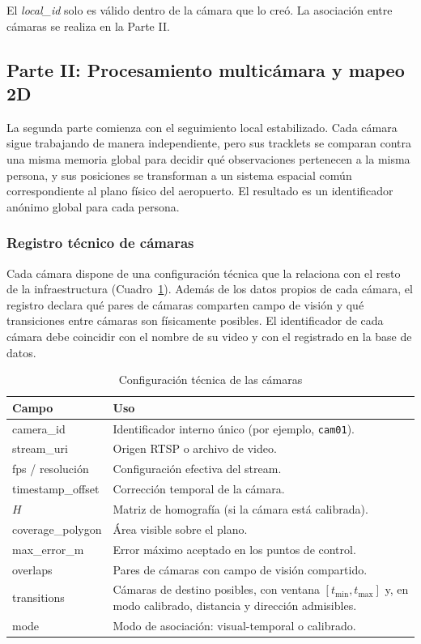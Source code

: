 \documentclass[12pt,letterpaper]{article}
\begin{document}
El \textit{local\_id} solo es válido dentro de la cámara que lo creó. La
asociación entre cámaras se realiza en la Parte II.

\subsection{Parte II: Procesamiento multicámara y mapeo 2D}

La segunda parte comienza con el seguimiento local estabilizado. Cada
cámara sigue trabajando de manera independiente, pero sus tracklets se
comparan contra una misma memoria global para decidir qué observaciones
pertenecen a la misma persona, y sus posiciones se transforman a un
sistema espacial común correspondiente al plano físico del aeropuerto.
El resultado es un identificador anónimo global para cada persona.

\subsubsection{Registro técnico de cámaras}

Cada cámara dispone de una configuración técnica que la relaciona con el
resto de la infraestructura (Cuadro~\ref{tab:camera_configuration}).
Además de los datos propios de cada cámara, el registro declara qué pares
de cámaras comparten campo de visión y qué transiciones entre cámaras son
físicamente posibles. El identificador de cada cámara debe coincidir con
el nombre de su video y con el registrado en la base de datos.

\begin{table}[H]
\caption{Configuración técnica de las cámaras}
\label{tab:camera_configuration}
\centering
\footnotesize
\begin{tabular}{p{}p{}}
\hline
\textbf{Campo} & \textbf{Uso} \\
\hline
camera\_id & Identificador interno único (por ejemplo, \texttt{cam01}). \\
stream\_uri & Origen RTSP o archivo de video. \\
fps / resolución & Configuración efectiva del stream. \\
timestamp\_offset & Corrección temporal de la cámara. \\
$H$ & Matriz de homografía (si la cámara está calibrada). \\
coverage\_polygon & Área visible sobre el plano. \\
max\_error\_m & Error máximo aceptado en los puntos de control. \\
overlaps & Pares de cámaras con campo de visión compartido. \\
transitions & Cámaras de destino posibles, con ventana $[t_{\min},t_{\max}]$ y, en modo calibrado, distancia y dirección admisibles. \\
mode & Modo de asociación: visual-temporal o calibrado. \\
\hline
\end{tabular}
\end{table}
\end{document}
